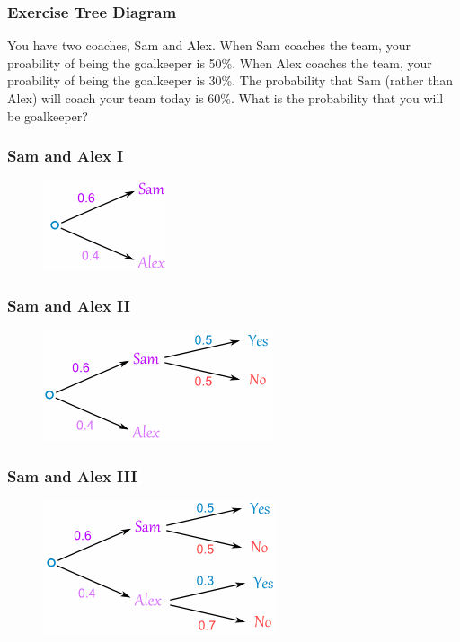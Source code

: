 \documentclass[xcolor=dvipsnames]{beamer}
\begin{document}
\begin{frame}
  \frametitle{Exercise Tree Diagram}
{\ubung} You have two coaches, Sam and Alex. When Sam
coaches the team, your proability of being the goalkeeper is 50\%. When Alex
coaches the team, your proability of being the goalkeeper is 30\%. The
probability that Sam (rather than Alex) will coach your team today is
60\%. What is the probability that you will be goalkeeper?
\end{frame}

\newcommand{\sam}{.65}

\begin{frame}
  \frametitle{Sam and Alex I}
\begin{figure}[h]
\includegraphics[scale=\sam]{./diagrams/sam1.png}
\end{figure}
\end{frame}

\begin{frame}
  \frametitle{Sam and Alex II}
\begin{figure}[h]
\includegraphics[scale=\sam]{./diagrams/sam2.png}
\end{figure}
\end{frame}

\begin{frame}
  \frametitle{Sam and Alex III}
\begin{figure}[h]
\includegraphics[scale=\sam]{./diagrams/sam3.png}
\end{figure}
\end{frame}
\end{document}
